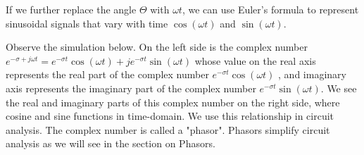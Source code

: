 \documentclass{ximera}
\begin{document}
If we further replace the angle $\Theta$ with $\omega t$, we can use Euler's formula to represent sinusoidal signals that vary with time $\cos(\omega t)$ and $\sin (\omega t)$. 


Observe the simulation below. On the left side is the complex number $e^{-\sigma +j \omega t} = e^{-\sigma t} \cos(\omega t) + j e^{-\sigma t} \sin (\omega t)$ whose value on the real axis represents the real part of the complex number $e^{-\sigma t} \cos(\omega t)$ , and imaginary axis represents the imaginary part of the complex number $e^{-\sigma t} \sin (\omega t)$. We see the real and imaginary parts of this complex number on the right side, where cosine and sine functions in time-domain. We use this relationship in circuit analysis. The complex number is called a "phasor". Phasors simplify circuit analysis as we will see in the section on Phasors.

  
 \begin{center}  
\end{center} 
\end{document}
